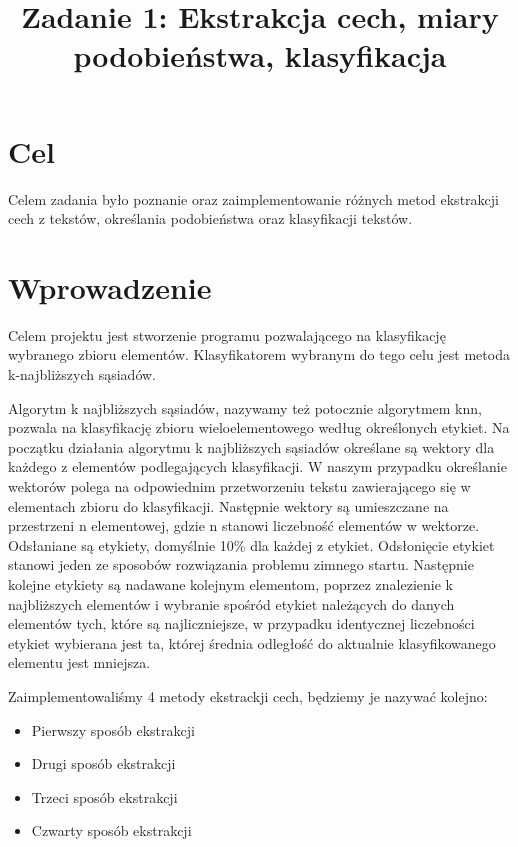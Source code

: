 \documentclass{classrep}
\author{
  \studentinfo{Stanisław Zakrzewski}{210360} \and
  \studentinfo{ Maciej Socha}{210321}
}
\title{Zadanie 1: Ekstrakcja cech, miary podobieństwa, klasyfikacja}
\begin{document}
\maketitle
\newpage

\section{Cel}
Celem zadania było poznanie oraz zaimplementowanie różnych metod ekstrakcji cech z tekstów, określania podobieństwa oraz klasyfikacji tekstów.

\section{Wprowadzenie}
	Celem projektu jest stworzenie programu pozwalającego na klasyfikację  wybranego zbioru elementów. Klasyfikatorem wybranym do tego celu jest metoda k-najbliższych sąsiadów.
	
	Algorytm k najbliższych sąsiadów, nazywamy też potocznie algorytmem knn, pozwala na klasyfikację zbioru wieloelementowego według określonych etykiet. Na początku działania algorytmu k najbliższych sąsiadów określane są wektory dla każdego z elementów podlegających klasyfikacji. W naszym przypadku określanie wektorów polega na odpowiednim przetworzeniu tekstu zawierającego się w elementach zbioru do klasyfikacji. Następnie wektory są umieszczane na przestrzeni n elementowej, gdzie n stanowi liczebność elementów w wektorze. Odsłaniane są etykiety, domyślnie 10\% dla każdej z etykiet. Odsłonięcie etykiet stanowi jeden ze sposobów rozwiązania problemu zimnego startu. Następnie kolejne etykiety są nadawane kolejnym elementom, poprzez znalezienie k najbliższych elementów i wybranie spośród etykiet należących do danych elementów tych, które są najliczniejsze, w przypadku identycznej liczebności etykiet wybierana jest ta, której średnia odległość do aktualnie klasyfikowanego elementu jest mniejsza.
	
	Zaimplementowaliśmy 4 metody ekstrackji cech, będziemy je nazywać kolejno:
	\begin{itemize}
	    \item Pierwszy sposób ekstrakcji
	    \item Drugi sposób ekstrakcji
	    \item Trzeci sposób ekstrakcji
	    \item Czwarty sposób ekstrakcji
	\end{itemize}
	
\end{document}
